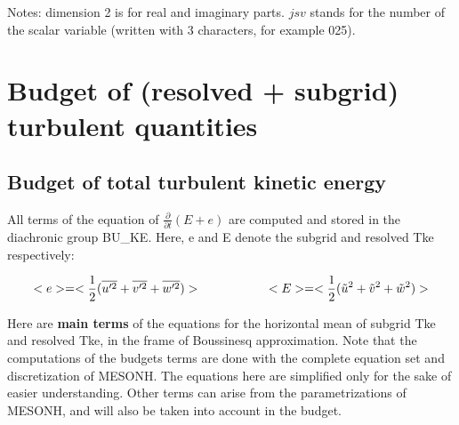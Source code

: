 \endgroup

Notes: dimension 2 is for real and imaginary parts. $jsv$ stands for the number of the scalar variable (written with 3 characters, for example 025).


\section{Budget of (resolved + subgrid) turbulent quantities}

\subsection{Budget of total turbulent kinetic energy}


All terms of the equation of $\frac{\partial}{\partial t} (E+e)$ are
computed and stored in the diachronic group BU\_KE. Here, e and E
denote the subgrid and resolved Tke respectively:

\begin{displaymath}
<e>=<\frac{1}{2}(\overline{u'^2}+\overline{v'^2}+\overline{w'^2})> \hspace*{2.cm}
<E>=<\frac{1}{2}(\tilde{u}^2+\tilde{v}^2+\tilde{w}^2)>
\end{displaymath}


Here are {\bf main terms} of the equations for the horizontal mean
of subgrid Tke and resolved Tke, in the
frame of Boussinesq approximation. Note that the computations of the budgets terms are done with the complete equation set and discretization of MESONH.
The equations here are simplified only for the sake of easier
understanding.
Other terms can arise
from the parametrizations of MESONH, and will also be taken into account
in the budget.

